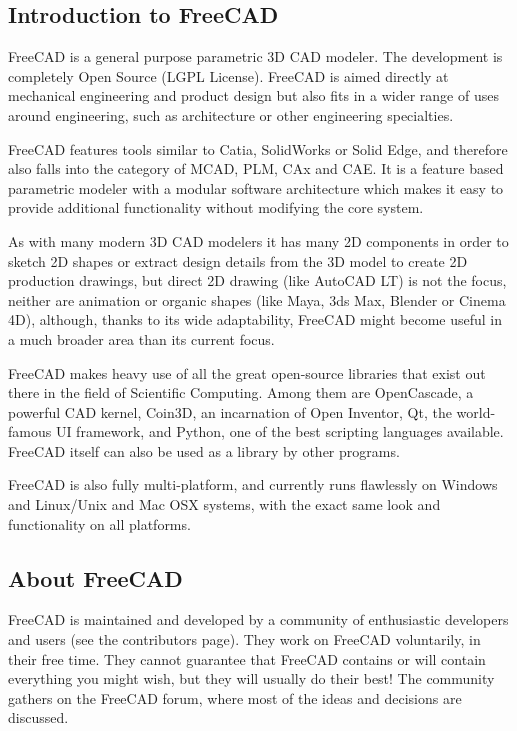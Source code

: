 

\subsection{Introduction to FreeCAD}

FreeCAD is a general purpose parametric 3D CAD modeler. The development 
is completely Open Source (LGPL License). FreeCAD is aimed directly at 
mechanical engineering and product design but also fits in a wider range 
of uses around engineering, such as architecture or other engineering specialties.

FreeCAD features tools similar to Catia, SolidWorks or Solid Edge, and 
therefore also falls into the category of MCAD, PLM, CAx and CAE. It is a 
feature based parametric modeler with a modular software architecture which 
makes it easy to provide additional functionality without modifying the core system.

As with many modern 3D CAD modelers it has many 2D components in order 
to sketch 2D shapes or extract design details from the 3D model to create 
2D production drawings, but direct 2D drawing (like AutoCAD LT) is not the 
focus, neither are animation or organic shapes (like Maya, 3ds Max, Blender 
or Cinema 4D), although, thanks to its wide adaptability, FreeCAD might 
become useful in a much broader area than its current focus.

FreeCAD makes heavy use of all the great open-source libraries that exist 
out there in the field of Scientific Computing. Among them are OpenCascade, 
a powerful CAD kernel, Coin3D, an incarnation of Open Inventor, Qt, the world-famous 
UI framework, and Python, one of the best scripting languages available. 
FreeCAD itself can also be used as a library by other programs.

FreeCAD is also fully multi-platform, and currently runs flawlessly on 
Windows and Linux/Unix and Mac OSX systems, with the exact same look and 
functionality on all platforms.

\subsection{About FreeCAD}
FreeCAD is maintained and developed by a community of enthusiastic developers 
and users (see the contributors page). They work on FreeCAD voluntarily, 
in their free time. They cannot guarantee that FreeCAD contains or will 
contain everything you might wish, but they will usually do their best! 
The community gathers on the FreeCAD forum, where most of the ideas and 
decisions are discussed.

